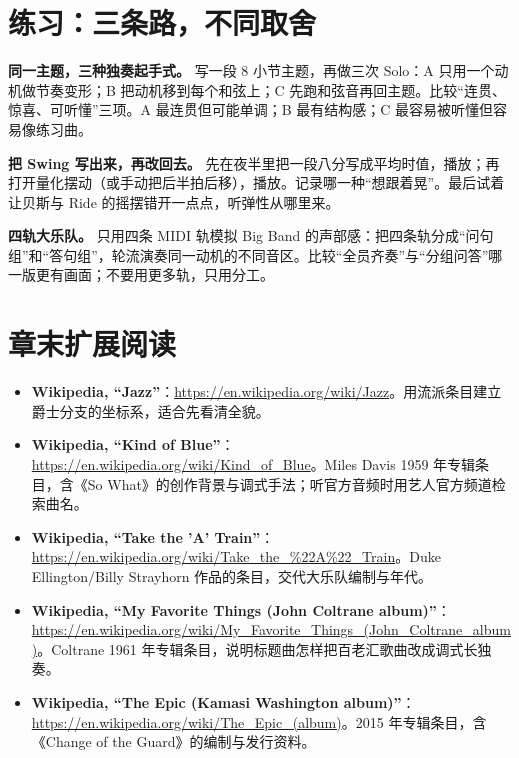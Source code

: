 \section{练习：三条路，不同取舍}
\label{sec:jazz-practice}

\begin{exercise}
\textbf{同一主题，三种独奏起手式。} 写一段 8 小节主题，再做三次 Solo：A 只用一个动机做节奏变形；B 把动机移到每个和弦上；C 先跑和弦音再回主题。比较“连贯、惊喜、可听懂”三项。A 最连贯但可能单调；B 最有结构感；C 最容易被听懂但容易像练习曲。
\end{exercise}

\begin{exercise}
\textbf{把 Swing 写出来，再改回去。} 先在夜半里把一段八分写成平均时值，播放；再打开量化摆动（或手动把后半拍后移），播放。记录哪一种“想跟着晃”。最后试着让贝斯与 Ride 的摇摆错开一点点，听弹性从哪里来。
\end{exercise}

\begin{exercise}
\textbf{四轨大乐队。} 只用四条 MIDI 轨模拟 Big Band 的声部感：把四条轨分成“问句组”和“答句组”，轮流演奏同一动机的不同音区。比较“全员齐奏”与“分组问答”哪一版更有画面；不要用更多轨，只用分工。
\end{exercise}

\section{章末扩展阅读}
\label{sec:jazz-reading}

\begin{sloppypar}
\begin{itemize}
\item \textbf{Wikipedia, “Jazz”}：\url{https://en.wikipedia.org/wiki/Jazz}。用流派条目建立爵士分支的坐标系，适合先看清全貌。
\item \textbf{Wikipedia, “Kind of Blue”}：\url{https://en.wikipedia.org/wiki/Kind_of_Blue}。Miles Davis 1959 年专辑条目，含《So What》的创作背景与调式手法；听官方音频时用艺人官方频道检索曲名。
\item \textbf{Wikipedia, “Take the 'A' Train”}：\url{https://en.wikipedia.org/wiki/Take_the_%22A%22_Train}。Duke Ellington/Billy Strayhorn 作品的条目，交代大乐队编制与年代。
\item \textbf{Wikipedia, “My Favorite Things (John Coltrane album)”}：\url{https://en.wikipedia.org/wiki/My_Favorite_Things_(John_Coltrane_album)}。Coltrane 1961 年专辑条目，说明标题曲怎样把百老汇歌曲改成调式长独奏。
\item \textbf{Wikipedia, “The Epic (Kamasi Washington album)”}：\url{https://en.wikipedia.org/wiki/The_Epic_(album)}。2015 年专辑条目，含《Change of the Guard》的编制与发行资料。
\end{itemize}
\end{sloppypar}

